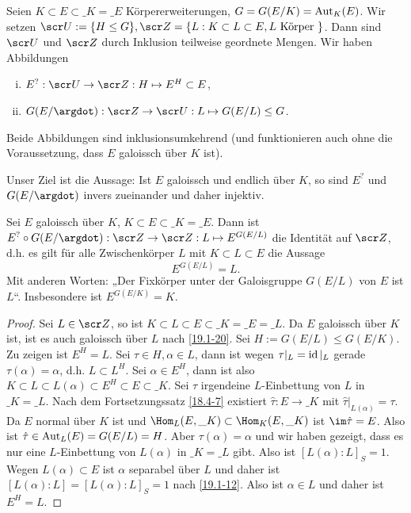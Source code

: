 \begin{conv} \label{19.4-12}
	Seien $K \subset E \subset \_K = \_E$ Körpererweiterungen, $G = G(E / K) = \operatorname{Aut}_K(E)$.
	Wir setzen $\scr U := \{ H \le G \}, \scr Z = \{ L : K \subset L \subset E, L\text{ Körper } \}$.
	Dann sind $\scr U$ und $\scr Z$ durch Inklusion teilweise geordnete Mengen.
	Wir haben Abbildungen
	\begin{enumerate}[i)]
		\item
			$E^? : \scr U \to \scr Z : H \mapsto E^H \subset E$,
		\item
			$G(E / \argdot): \scr Z \to \scr U : L \mapsto G(E / L) \le G$.
	\end{enumerate}
	Beide Abbildungen sind inklusionsumkehrend (und funktionieren auch ohne die Voraussetzung, dass $E$ galoissch über $K$ ist).
\end{conv}

Unser Ziel ist die Aussage:
Ist $E$ galoissch und endlich über $K$, so sind $E^?$ und $G(E / \argdot)$ invers zueinander und daher injektiv.

\begin{st} \label{19.4-13}
	Sei $E$ galoissch über $K$, $K \subset E \subset \_K = \_E$.
	Dann ist $E^? \circ G(E / \argdot) : \scr Z \to \scr Z : L \mapsto E^{G(E / L)}$ die Identität auf $\scr Z$, d.h. es gilt für alle Zwischenkörper $L$ mit $K \subset L \subset E$ die Aussage
	\[
		E^{G(E / L)} = L.
	\]
	Mit anderen Worten: „Der Fixkörper unter der Galoisgruppe $G(E / L)$ von $E$ ist $L$“.
	Insbesondere ist $E^{G(E/K)} = K$.
	\begin{proof}
		Sei $L \in \scr Z$, so ist $K \subset L \subset E \subset \_K = \_E = \_L$.
		Da $E$ galoissch über $K$ ist, ist es auch galoissch über $L$ nach \ref{19.1-20}.
		Sei $H := G(E / L) \le G(E / K)$.
		Zu zeigen ist $E^H = L$.
		Sei $\tau \in H, \alpha \in L$, dann ist wegen $\tau|_L = \operatorname{id}|_L$ gerade $\tau(\alpha) = \alpha$, d.h. $L \subset L^H$.
		Sei $\alpha \in E^H$, dann ist also $K \subset L \subset L(\alpha) \subset E^H \subset E \subset \_K$.
		Sei $\tau$ irgendeine $L$-Einbettung von $L$ in $\_K = \_L$.
		Nach dem Fortsetzungssatz \ref{18.4-7} existiert $\hat \tau: E \to \_K$ mit $\hat \tau|_{L(\alpha)} = \tau$.
		Da $E$ normal über $K$ ist und $\Hom_L(E, \_K) \subset \Hom_K (E, \_K)$ ist $\im \hat \tau = E$.
		Also ist $\hat \tau \in \operatorname{Aut}_L(E) = G(E / L) = H$.
		Aber $\tau(\alpha) = \alpha$ und wir haben gezeigt, dass es nur eine $L$-Einbettung von $L(\alpha)$ in $\_K = \_L$ gibt.
		Also ist $[L(\alpha) : L]_S = 1$.
		Wegen $L(\alpha) \subset E$ ist $\alpha$ separabel über $L$ und daher ist $[L(\alpha) : L] = [L(\alpha) : L]_S = 1$ nach \ref{19.1-12}.
		Also ist $\alpha \in L$ und daher ist $E^H = L$.
	\end{proof}
\end{st}

